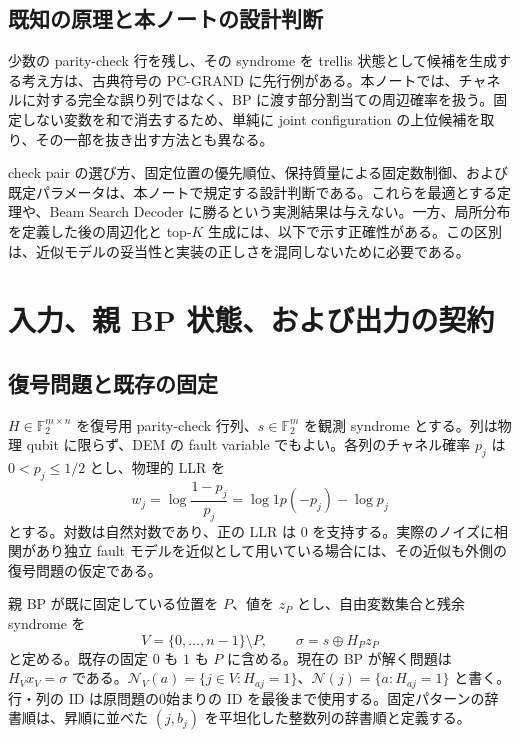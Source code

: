 \documentclass[a4paper,11pt]{ltjsarticle}
\numberwithin{equation}{section}
\theoremstyle{definition}
\newcommand{\Ftwo}{\mathbb F_2}
\newcommand{\N}{\mathcal N}
\begin{document}
\subsection{既知の原理と本ノートの設計判断}
少数の parity-check 行を残し、その syndrome を trellis 状態として候補を生成する考え方は、古典符号の PC-GRAND に先行例がある\cite{pcgrand}。本ノートでは、チャネルに対する完全な誤り列ではなく、BP に渡す部分割当ての周辺確率を扱う。固定しない変数を和で消去するため、単純に joint configuration の上位候補を取り、その一部を抜き出す方法とも異なる。

check pair の選び方、固定位置の優先順位、保持質量による固定数制御、および既定パラメータは、本ノートで規定する設計判断である。これらを最適とする定理や、Beam Search Decoder に勝るという実測結果は与えない。一方、局所分布を定義した後の周辺化と top-$K$ 生成には、以下で示す正確性がある。この区別は、近似モデルの妥当性と実装の正しさを混同しないために必要である。

\section{入力、親 BP 状態、および出力の契約}
\subsection{復号問題と既存の固定}
$H\in\Ftwo^{m\times n}$ を復号用 parity-check 行列、$s\in\Ftwo^m$ を観測 syndrome とする。列は物理 qubit に限らず、DEM の fault variable でもよい。各列のチャネル確率 $p_j$ は $0<p_j\le1/2$ とし、物理的 LLR を
\begin{equation}
 w_j=\log\frac{1-p_j}{p_j}
     =\log1p(-p_j)-\log p_j
 \label{eq:channel}
\end{equation}
とする。対数は自然対数であり、正の LLR は $0$ を支持する。実際のノイズに相関があり独立 fault モデルを近似として用いている場合には、その近似も外側の復号問題の仮定である。

親 BP が既に固定している位置を $P$、値を $z_P$ とし、自由変数集合と残余 syndrome を
\begin{equation}
 V=\{0,\ldots,n-1\}\setminus P,\qquad
 \sigma=s\oplus H_Pz_P
 \label{eq:parent}
\end{equation}
と定める。既存の固定 $0$ も $1$ も $P$ に含める。現在の BP が解く問題は $H_Vx_V=\sigma$ である。$\N_V(a)=\{j\in V:H_{aj}=1\}$、$\N(j)=\{a:H_{aj}=1\}$ と書く。行・列の ID は原問題の0始まりの ID を最後まで使用する。固定パターンの辞書順は、昇順に並べた $(j,b_j)$ を平坦化した整数列の辞書順と定義する。
\end{document}
